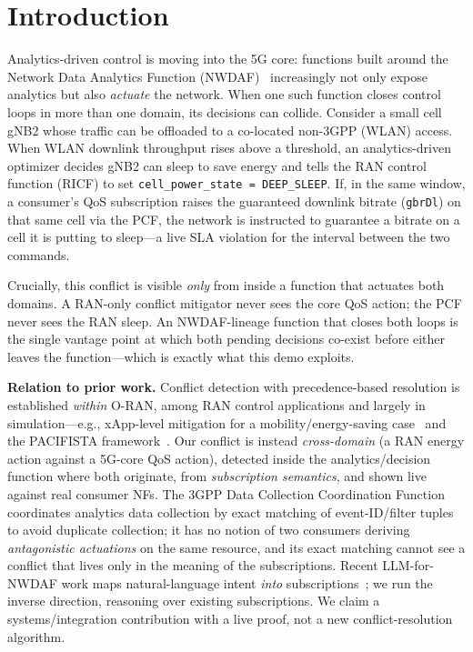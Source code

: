 \documentclass[conference]{IEEEtran}
\begin{document}
\section{Introduction}
Analytics-driven control is moving into the 5G core: functions built around the
Network Data Analytics Function (NWDAF)~\cite{ts23288} increasingly not only
expose analytics but also \emph{actuate} the network. When one such
function closes control loops in more than one domain, its decisions can
collide. Consider a small cell gNB2 whose traffic can be offloaded to a
co-located non-3GPP (WLAN) access. When WLAN downlink throughput rises above a
threshold, an analytics-driven optimizer decides gNB2 can sleep to save energy
and tells the RAN control function (RICF) to set
\texttt{cell\_power\_state = DEEP\_SLEEP}. If, in the same window, a consumer's
QoS subscription raises the guaranteed downlink bitrate (\texttt{gbrDl}) on that
same cell via the PCF, the network is instructed to guarantee a bitrate on a
cell it is putting to sleep---a live SLA violation for the interval between the
two commands.

Crucially, this conflict is visible \emph{only} from inside a function that
actuates both domains. A RAN-only conflict mitigator never sees the core QoS
action; the PCF never sees the RAN sleep. An NWDAF-lineage function that closes
both loops is the single vantage point at which both pending decisions co-exist
before either leaves the function---which is exactly what this demo exploits.

\textbf{Relation to prior work.} Conflict detection with precedence-based
resolution is established \emph{within} O-RAN, among RAN control
applications and largely in simulation---e.g., xApp-level mitigation for a
mobility/energy-saving case~\cite{wadud} and the PACIFISTA
framework~\cite{pacifista}. Our conflict is instead \emph{cross-domain} (a RAN
energy action against a 5G-core QoS action), detected inside the
analytics/decision function where both originate, from \emph{subscription
semantics}, and shown live against real consumer NFs. The 3GPP Data Collection
Coordination Function~\cite{ts23288,ts29574} coordinates analytics data
collection by exact matching of event-ID/filter tuples to avoid duplicate
collection; it has no notion of two consumers deriving \emph{antagonistic
actuations} on the same resource, and its exact matching cannot see a conflict
that lives only in the meaning of the subscriptions. Recent LLM-for-NWDAF
work maps natural-language intent \emph{into} subscriptions~\cite{llmnwdaf};
we run the inverse direction, reasoning over existing subscriptions. We claim
a systems/integration contribution with a live proof, not a new
conflict-resolution algorithm.
\end{document}
